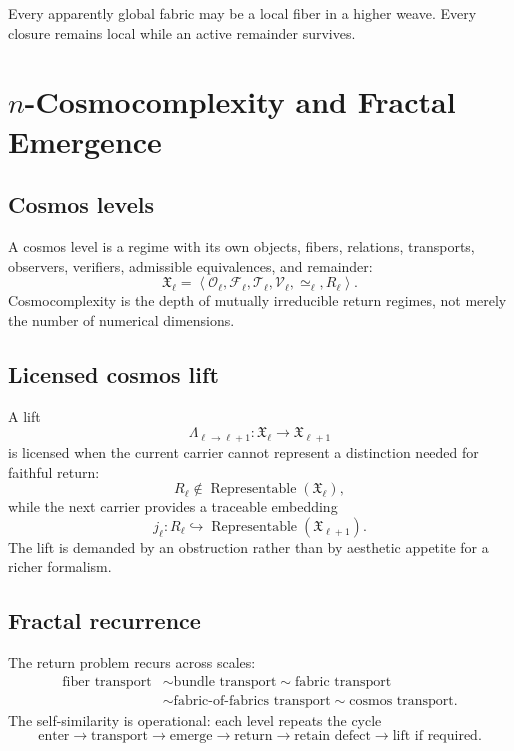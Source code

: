 \documentclass[12pt,openany]{book}
\theoremstyle{remark}
\DeclareMathOperator{\Rep}{Representable}
\newcommand{\Cosmos}{\mathfrak X}
\newcommand{\typedtuple}[1]{\left\langle #1 \right\rangle}
\begin{document}
\begin{invariantbox}
Every apparently global fabric may be a local fiber in a higher weave. Every closure remains local while an active remainder survives.
\end{invariantbox}

\chapter{\texorpdfstring{$n$}{n}-Cosmocomplexity and Fractal Emergence}
\label{ch:cosmocomplexity}

\section{Cosmos levels}
A cosmos level is a regime with its own objects, fibers, relations, transports, observers, verifiers, admissible equivalences, and remainder:
\[
\Cosmos_\ell
=
\typedtuple{
\mathcal O_\ell,
\mathcal F_\ell,
\mathcal T_\ell,
\mathcal V_\ell,
\simeq_\ell,
R_\ell
}.
\]
Cosmocomplexity is the depth of mutually irreducible return regimes, not merely the number of numerical dimensions.

\section{Licensed cosmos lift}
A lift
\[
\Lambda_{\ell\to\ell+1}:\Cosmos_\ell\to\Cosmos_{\ell+1}
\]
is licensed when the current carrier cannot represent a distinction needed for faithful return:
\[
R_\ell\notin\Rep(\Cosmos_\ell),
\]
while the next carrier provides a traceable embedding
\[
j_\ell:R_\ell\hookrightarrow\Rep(\Cosmos_{\ell+1}).
\]
The lift is demanded by an obstruction rather than by aesthetic appetite for a richer formalism.

\section{Fractal recurrence}
The return problem recurs across scales:
\[
\begin{aligned}
\text{fiber transport}&\sim\text{bundle transport}\sim\text{fabric transport}\\
&\sim\text{fabric-of-fabrics transport}\sim\text{cosmos transport}.
\end{aligned}
\]
The self-similarity is operational: each level repeats the cycle
\[
\text{enter}
\to
\text{transport}
\to
\text{emerge}
\to
\text{return}
\to
\text{retain defect}
\to
\text{lift if required}.
\]
\end{document}
